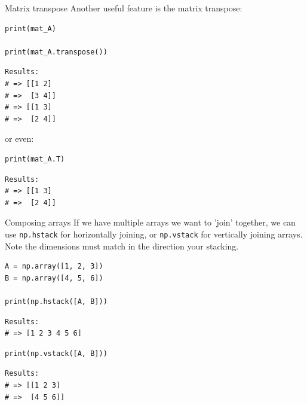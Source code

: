 \documentclass[10pt]{beamer}
\begin{document}
\begin{frame}[label={sec:org47931aa},fragile]{Matrix transpose}
 Another useful feature is the matrix transpose:

\begin{verbatim}
print(mat_A)

print(mat_A.transpose())
\end{verbatim}

\begin{verbatim}
Results: 
# => [[1 2]
# =>  [3 4]]
# => [[1 3]
# =>  [2 4]]
\end{verbatim}


or even:

\begin{verbatim}
print(mat_A.T)
\end{verbatim}

\begin{verbatim}
Results: 
# => [[1 3]
# =>  [2 4]]
\end{verbatim}
\end{frame}


\begin{frame}[label={sec:org827f52a},fragile]{Composing arrays}
 If we have multiple arrays we want to 'join' together, we can use \texttt{np.hstack} for
horizontally joining, or \texttt{np.vstack} for vertically joining arrays. \alert{Note} the dimensions
must match in the direction your stacking.

\begin{verbatim}
A = np.array([1, 2, 3])
B = np.array([4, 5, 6])

print(np.hstack([A, B]))
\end{verbatim}

\begin{verbatim}
Results: 
# => [1 2 3 4 5 6]
\end{verbatim}


\begin{verbatim}
print(np.vstack([A, B]))
\end{verbatim}

\begin{verbatim}
Results: 
# => [[1 2 3]
# =>  [4 5 6]]
\end{verbatim}
\end{frame}
\end{document}
